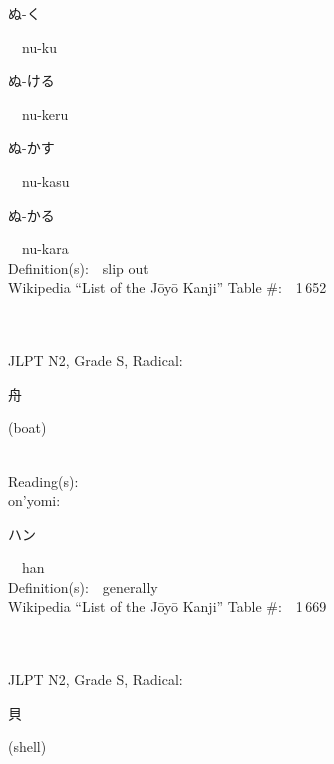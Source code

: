 \begin{multicols}{2}
{\hspace*{2em}}{\begin{CJK}{UTF8}{min} ぬ-く \end{CJK}}\ \ nu-ku\ \ \\
{\hspace*{2em}}{\begin{CJK}{UTF8}{min} ぬ-ける \end{CJK}}\ \ nu-keru\ \ \\
{\hspace*{2em}}{\begin{CJK}{UTF8}{min} ぬ-かす \end{CJK}}\ \ nu-kasu\ \ \\
{\hspace*{2em}}{\begin{CJK}{UTF8}{min} ぬ-かる \end{CJK}}\ \ nu-kara\ \ \\
Definition(s):\ \ slip out \\
Wikipedia ``List of the J\=oy\=o Kanji'' Table \#:\ \ 1\,652 \\
\ \ \\
{\fontsize{34pt}{40pt}  }\ \ \\  %
{JLPT N2, Grade S, Radical:\ \ {\begin{CJK}{UTF8}{min} 舟 \end{CJK}} (boat) } \\
Reading(s):\ \ \\
{\hspace*{1em}}on'yomi:\ \ \\
{\hspace*{2em}}{\begin{CJK}{UTF8}{min} ハン \end{CJK}}\ \ han\ \ \\
Definition(s):\ \ generally \\
Wikipedia ``List of the J\=oy\=o Kanji'' Table \#:\ \ 1\,669 \\
\ \ \\
{\fontsize{34pt}{40pt}  }\ \ \\  %
{JLPT N2, Grade S, Radical:\ \ {\begin{CJK}{UTF8}{min} 貝 \end{CJK}} (shell) } \\

\end{multicols}
